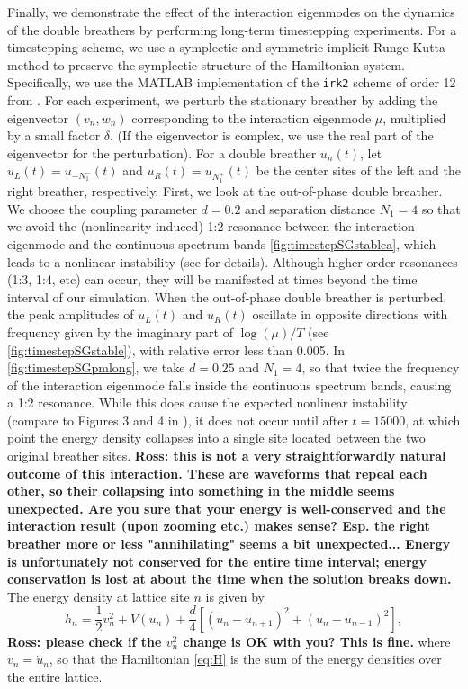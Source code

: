 \documentclass[12pt,reqno]{amsart}
\theoremstyle{definition}
\begin{document}
Finally, we demonstrate the effect of the interaction eigenmodes on the dynamics of the double breathers by performing long-term timestepping experiments. For a timestepping scheme, we use a symplectic and symmetric implicit Runge-Kutta method \cite{HairerBook} to preserve the symplectic structure of the Hamiltonian system. Specifically, we use the MATLAB implementation of the \texttt{irk2} scheme of order 12 from \cite{Hairer2003}.
For each experiment, we perturb the stationary breather by adding the eigenvector $(v_n, w_n)$ corresponding to the interaction eigenmode $\mu$, multiplied by a small factor $\delta$. (If the eigenvector is complex, we use the real part of the eigenvector for the perturbation).
For a double breather $u_n(t)$, let $u_L(t) = u_{-N_1^-}(t)$ and $u_R(t) = u_{N_1^+}(t)$ be the center sites of the left and the right breather, respectively. First, we look at the out-of-phase double breather. We choose the coupling parameter $d=0.2$ and separation distance $N_1 = 4$ so that we avoid the (nonlinearity induced) 1:2 resonance between the interaction eigenmode and the continuous spectrum bands \cref{fig:timestepSGstablea}, which leads to a nonlinear instability (see \cite{cuevas-maraver2016} for details). Although higher order resonances (1:3, 1:4, etc) can occur, they will be manifested at times beyond the time interval of our simulation. When the out-of-phase double breather is perturbed, the peak amplitudes of $u_L(t)$ and $u_R(t)$ oscillate in opposite directions with frequency given by the imaginary part of $\log(\mu)/T$ (see \cref{fig:timestepSGstable}), with relative error less than 0.005. In \cref{fig:timestepSGpmlong}, we take $d=0.25$ and $N_1 = 4$, so that twice the frequency of the interaction eigenmode falls inside the continuous spectrum bands, causing a 1:2 resonance. While this does cause the expected nonlinear instability (compare to Figures 3 and 4 in \cite{cuevas-maraver2016}), it does not occur until after $t = 15000$, at which point the energy density collapses into a single site located between the two original breather sites.
{\bf Ross: this is not a very straightforwardly natural
outcome of this interaction. These are waveforms that repeal
each other, so their collapsing into something in the middle
seems unexpected. Are you sure that your energy is well-conserved
and the interaction result (upon zooming etc.) makes sense? Esp.
the right breather more or less "annihilating" seems a bit 
unexpected... Energy is unfortunately not conserved for the entire time interval; energy conservation is lost at about the time when the solution breaks down.}
The energy density at lattice site $n$ is given by
\begin{equation}\label{eq:Hn}
h_n = \frac{1}{2}v_n^2 + V(u_n) 
+ \frac{d}{4}\left[ (u_n - u_{n+1})^2 + (u_n - u_{n-1})^2\right],
\end{equation}
{\bf Ross: please check if the $v_n^2$ change is OK with you? This is fine.}
where $v_n = \dot{u}_n$, so that the Hamiltonian \cref{eq:H} is the sum of the energy densities over the entire lattice. 
\end{document}
